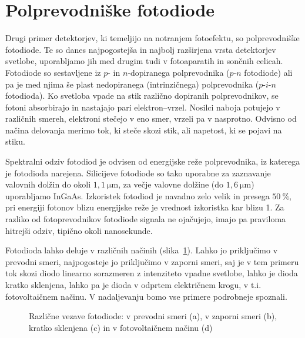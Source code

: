 \section{Polprevodniške fotodiode}
Drugi primer detektorjev, ki temeljijo na notranjem fotoefektu,
so polprevodniške fotodiode.
Te so danes najpogostejša in najbolj razširjena vrsta detektorjev svetlobe, uporabljamo jih med
drugim tudi v fotoaparatih in sončnih celicah. Fotodiode so sestavljene iz $p$- in $n$-dopiranega 
polprevodnika ($p$-$n$ fotodiode) ali pa je med njima še plast nedopiranega (intrinzičnega) 
polprevodnika ($p$-$i$-$n$ fotodioda). Ko svetloba vpade na stik različno dopiranih polprevodnikov,
se fotoni absorbirajo in nastajajo 
pari elektron--vrzel. Nosilci naboja potujejo v različnih smereh, elektroni stečejo v eno smer,
vrzeli pa v nasprotno. Odvisno od načina delovanja merimo tok, ki steče skozi 
stik, ali napetost, ki se pojavi na stiku. 

Spektralni odziv 
fotodiod je odvisen od energijske reže polprevodnika, 
iz katerega je fotodioda narejena.
Silicijeve  fotodiode so tako uporabne za zaznavanje valovnih dolžin do okoli
$1,1~\si{\micro\meter}$, za večje valovne dolžine (do $1,6~\si{\micro\meter}$) 
uporabljamo InGaAs. Izkoristek fotodiod
je navadno zelo velik in presega $50~\%$, pri energiji fotonov blizu energijske reže 
je vrednost izkoristka kar blizu 1.
Za razliko od fotoprevodnikov fotodiode signala
ne ojačujejo, imajo pa praviloma hitrejši odziv, tipično okoli nanosekunde.

Fotodioda lahko deluje v različnih načinih (slika~\ref{11_PD}). 
Lahko jo priključimo v prevodni smeri,
najpogosteje jo priključimo v zaporni smeri, saj je v
tem primeru tok skozi diodo linearno sorazmeren z intenziteto vpadne svetlobe, lahko 
je dioda kratko sklenjena, lahko pa je dioda v odprtem električnem krogu, v t.i. fotovoltaičnem 
načinu. V nadaljevanju bomo vse primere podrobneje spoznali.
\begin{figure}[h]
\centering
\def\svgwidth{130truemm} 

\caption{Različne vezave fotodiode: v prevodni smeri (a), v zaporni smeri (b), kratko sklenjena (c) in 
v fotovoltaičnem načinu (d)}
\label{11_PD}
\end{figure}

